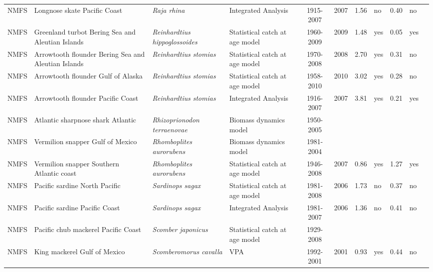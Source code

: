 \begin{longtable}{p{1.8cm}p{3.5cm}p{3.5cm}p{3cm}cccp{0.9cm}cp{0.9cm}c}
  NMFS & Longnose skate Pacific Coast & \textit{Raja rhina} & Integrated Analysis & 1915-2007 & 2007 & 1.56 & no & 0.40 & no & \cite{NWFSC-LNOSESKAPCOAST-2008-Longnose skate.pdf} \\ 
  NMFS & Greenland turbot Bering Sea and Aleutian Islands & \textit{Reinhardtius hippoglossoides} & Statistical catch at age model & 1960-2009 & 2009 & 1.48 & yes & 0.05 & yes & \cite{2008_SAFE_BSAIturbot.pdf} \\ 
  NMFS & Arrowtooth flounder Bering Sea and Aleutian Islands & \textit{Reinhardtius stomias} & Statistical catch at age model & 1970-2008 & 2008 & 2.70 & yes & 0.31 & no & \cite{AFSC-ARFLOUNDBSAI-2007-Arrowtooth flounder BSAI.pdf} \\ 
  NMFS & Arrowtooth flounder Gulf of Alaska & \textit{Reinhardtius stomias} & Statistical catch at age model & 1958-2010 & 2010 & 3.02 & yes & 0.28 & no & \cite{2008_SAFE_GOAatf.pdf} \\ 
  NMFS & Arrowtooth flounder Pacific Coast & \textit{Reinhardtius stomias} & Integrated Analysis & 1916-2007 & 2007 & 3.81 & yes & 0.21 & yes & \cite{NWFSC-ARFLOUNDPCOAST-2007-Arrowtooth flounder.pdf} \\ 
  NMFS & Atlantic sharpnose shark Atlantic & \textit{Rhizoprionodon terraenovae} & Biomass dynamics model & 1950-2005 &  &  &  &  &  & \cite{SmallcoastalAtl2007-SEFSC.pdf} \\ 
  NMFS & Vermilion snapper Gulf of Mexico & \textit{Rhomboplites aurorubens} & Biomass dynamics model & 1981-2004 &  &  &  &  &  & \cite{JENSEN_VSNAPGM_2006.pdf} \\ 
  NMFS & Vermilion snapper Southern Atlantic coast & \textit{Rhomboplites aurorubens} & Statistical catch at age model & 1946-2008 & 2007 & 0.86 & yes & 1.27 & yes & \cite{2008_SEDAR_VermillionSnapper_Satl.pdf} \\ 
  NMFS & Pacific sardine North Pacific & \textit{Sardinops sagax} & Statistical catch at age model & 1981-2008 & 2006 & 1.73 & no & 0.37 & no & \cite{2008 pac sardine.pdf} \\ 
  NMFS & Pacific sardine Pacific Coast & \textit{Sardinops sagax} & Integrated Analysis & 1981-2007 & 2006 & 1.36 & no & 0.41 & no & \cite{NOAA-TM-NMFS-SWFSC-413.pdf} \\ 
  NMFS & Pacific chub mackerel Pacific Coast & \textit{Scomber japonicus} & Statistical catch at age model & 1929-2008 &  &  &  &  &  & \cite{PFMC_2008_CPS_SAFE_App2_PMackerel.pdf} \\ 
  NMFS & King mackerel Gulf of Mexico & \textit{Scomberomorus cavalla} & VPA & 1992-2001 & 2001 & 0.93 & yes & 0.44 & no & \cite{JENSEN_KMACKGMSATLC_2004.pdf} \\ 

\end{longtable}
